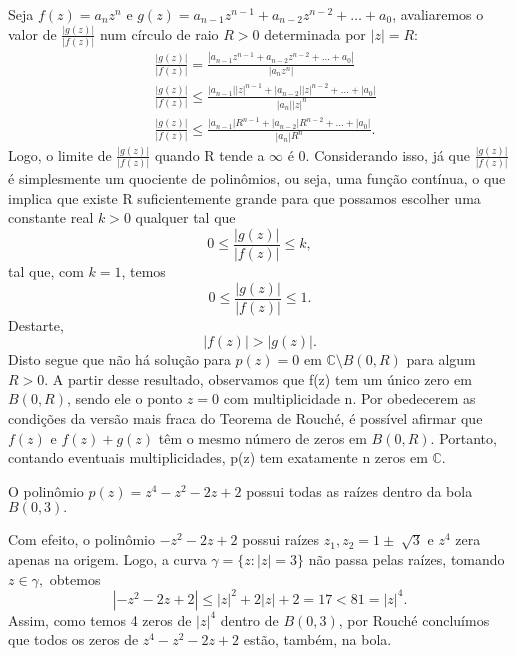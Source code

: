 \documentclass[ComplexAnalysis/complex.tex]{subfiles}
\begin{document}
\begin{proof*}
	Seja \(f(z) = a_{n}z^{n}\) e \(g(z) = a_{n-1}z^{n-1}+a_{n-2}z^{n-2}+\dotsc +a_{0}\), avaliaremos o valor de \(\frac{|g(z)|}{|f(z)|}\) num círculo de raio \(R > 0\) determinada por \(|z| = R:\)
	\begin{align*}
		 & \frac{|g(z)|}{|f(z)|} = \frac{|a_{n-1}z^{n-1} + a_{n-2}z^{n-2}+\dotsc +a_{0}|}{|a_{n}z^{n}|}              \\
		 & \frac{|g(z)|}{|f(z)|} \leq \frac{|a_{n-1}||z|^{n-1} + |a_{n-2}||z|^{n-2}+\dotsc +|a_{0}|}{|a_{n}||z|^{n}} \\
		 & \frac{|g(z)|}{|f(z)|} \leq \frac{|a_{n-1}|R^{n-1}+|a_{n-2}|R^{n-2}+\dotsc +|a_{0}|}{|a_{n}|R^{n}}.
	\end{align*}
	Logo, o limite de \(\frac{|g(z)|}{|f(z)|}\) quando R tende a \(\infty\) é 0. Considerando isso, já que \(\frac{|g(z)|}{|f(z)|}\) é simplesmente um quociente de polinômios, ou seja,
	uma função contínua, o que implica que existe R suficientemente grande para que possamos escolher uma constante real \(k > 0\) qualquer tal que
	\[
		0\leq \frac{|g(z)|}{|f(z)|}\leq k,
	\]
	tal que, com \(k=1\), temos
	\[
		0 \leq \frac{|g(z)|}{|f(z)|}\leq 1.
	\]
	Destarte,
	\[
		|f(z)| > |g(z)|.
	\]
	Disto segue que não há solução para \(p(z) = 0\) em \(\mathbb{C}\setminus{B(0, R)}\) para algum \(R > 0.\) A partir desse resultado, observamos que f(z) tem um único zero em \(B(0, R)\), sendo ele o ponto
	\(z=0\) com multiplicidade n. Por obedecerem as condições da versão mais fraca do Teorema de Rouché, é possível afirmar que \(f(z)\) e \(f(z) + g(z)\) têm o mesmo número de zeros em \(B(0, R)\). Portanto,
	contando eventuais multiplicidades, p(z) tem exatamente n zeros em \(\mathbb{C}.\) \qedsymbol
\end{proof*}
\begin{example}
	O polinômio \(p(z) = z^{4} - z^{2} - 2z + 2\) possui todas as raízes dentro da bola \(B(0, 3).\)

	Com efeito, o polinômio \(-z^{2} - 2z + 2\) possui raízes \(z_{1}, z_{2} = 1\pm \sqrt[]{3}\) e \(z^{4}\) zera apenas na origem. Logo, a curva \(\gamma  = \{z: |z| = 3\}\) não passa pelas raízes, tomando
	\(z\in \gamma ,\) obtemos
	\[
		|-z^{2} - 2z + 2| \leq |z|^{2} + 2|z| + 2 = 17 < 81 = |z|^{4}.
	\]
	Assim, como temos 4 zeros de \(|z|^{4}\) dentro de \(B(0, 3)\), por Rouché concluímos que todos os zeros de \(z^{4}-z^{2}-2z + 2\) estão, também, na bola.
\end{example}
\end{document}
